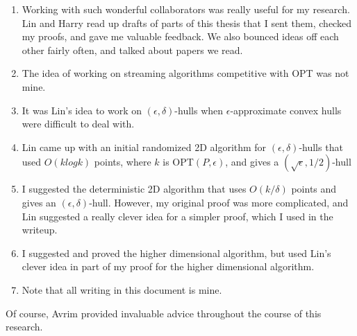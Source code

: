 \documentclass[12pt]{report}
\theoremstyle{definition}
\theoremstyle{lemma}
\theoremstyle{theorem}
\theoremstyle{corollary}
\begin{document}
\begin{enumerate}
\item Working with such wonderful collaborators was really useful for my research. Lin and Harry read up drafts of parts of this thesis that I sent them, checked my proofs, and gave me valuable feedback. We also bounced ideas off each other fairly often, and talked about papers we read.
\item The idea of working on streaming algorithms competitive with OPT was not mine.
\item It was Lin's idea to work on $(\epsilon, \delta)$-hulls when $\epsilon$-approximate convex hulls were difficult to deal with.
\item Lin came up with an initial randomized 2D algorithm for $(\epsilon, \delta)$-hulls that used $O(klogk)$ points, where $k$ is OPT$(P, \epsilon)$, and gives a $(\sqrt{\epsilon}, 1/2)$-hull
\item I suggested the deterministic 2D algorithm that uses $O(k/\delta)$ points and gives an $(\epsilon, \delta)$-hull. However, my original proof was more complicated, and Lin suggested a really clever idea for a simpler proof, which I used in the writeup.
\item I suggested and proved the higher dimensional algorithm, but used Lin's clever idea in part of my proof for the higher dimensional algorithm.
\item Note that all writing in this document is mine.
\end{enumerate}

Of course, Avrim provided invaluable advice throughout the course of this research.






\end{document}

